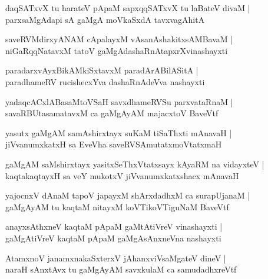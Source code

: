 \documentclass[twoside,12pt,openright]{book}
\newcounter{shloka}[chapter]
\begin{document}
\begin{shloka}%
daqSATxvX tu harateV pApaM sapxqqSATxvX tu laBateV divaM |\\
parxsaMgAdapi sA gaMgA moVkaSxdA tavxvagAhitA
\end{shloka}

\begin{shloka}%
saveRVMdirxyANAM cApalayxM vAsanAshakitxsAMBavaM |\\
niGaRqqNatavxM tatoV gaMgAdashaRnAtapxrXvinashayxti 
\end{shloka}

\begin{shloka}%
paradarxvAyxBikAMkiSxtavxM paradArABilASitA |\\
paradhameRV rucishecxYva dashaRnAdeVva nashayxti 
\end{shloka}

\begin{shloka}%
yadaqcACxlABasaMtoVSaH savxdhameRVSu parxvataRnaM |\\
savaRBUtasamatavxM ca gaMgAyAM majacxtoV BaveVtf 
\end{shloka}

\begin{shloka}%
yasutx gaMgAM samAshirxtayx suKaM tiSaThxti mAnavaH |\\
jiVvanumxkatxH sa EveVha saveRVSAmutatxmoVtatxmaH 
\end{shloka}

\begin{shloka}%
gaMgAM saMshirxtayx yasitxSeThxVtatxsayx kAyaRM na vidayxteV |\\
kaqtakaqtayxH sa veY mukotxV jiVvanumxkatxshacx mAnavaH 
\end{shloka}

\begin{shloka}%
yajocnxV dAnaM tapoV japayxM shArxdadhxM ca surapUjanaM |\\
gaMgAyAM tu kaqtaM nitayxM koVTikoVTiguNaM BaveVtf
\end{shloka}

\begin{shloka}%
anayxsAthxneV kaqtaM pApaM gaMtAtiVreV vinashayxti |\\
gaMgAtiVreV kaqtaM pApaM gaMgAsAnxneVna nashayxti 
\end{shloka}

\begin{shloka}%
AtamxnoV janamxnakaSxterxV jAhanxviVsaMgateV dineV |\\
naraH sAnxtAvx tu gaMgAyAM savxkulaM ca samudadhxreVtf
\end{shloka}
\end{document}
